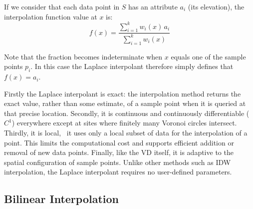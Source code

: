 %

If we consider that each data point in $S$ has an attribute $a_{i}$ (its elevation), the interpolation function value at $x$ is:
\begin{equation}
  f(x) = \frac{\sum_{i=1}^{k} w_{i}(x) \, a_{i}}{\sum_{i=1}^{k} w_{i}(x)}
  \label{eq:laplace2}
\end{equation}

Note that the fraction becomes indeterminate when $x$ equals one of the sample points $p_i$. 
In this case the Laplace interpolant therefore simply defines that $f(x) = a_i$.

%

Firstly the Laplace interpolant is exact: the interpolation method returns the exact value, rather than some estimate, of a sample point when it is queried at that precise location. 
Secondly, it is continuous and continuously differentiable ($C^1$) everywhere except at sites where finitely many Voronoi circles intersect. 
Thirdly, it is local, \ie\ it uses only a local subset of data for the interpolation of a point. 
This limits the computational cost and supports efficient addition or removal of new data points. 
Finally, like the VD itself, it is adaptive to the spatial configuration of sample points. 
Unlike other methods such as IDW interpolation, the Laplace interpolant requires no user-defined parameters.



\subsection{Bilinear Interpolation}

